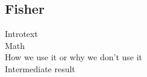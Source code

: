 \subsection{Fisher}

Introtext\\

Math\\

How we use it or why we don't use it\\

Intermediate result\\

